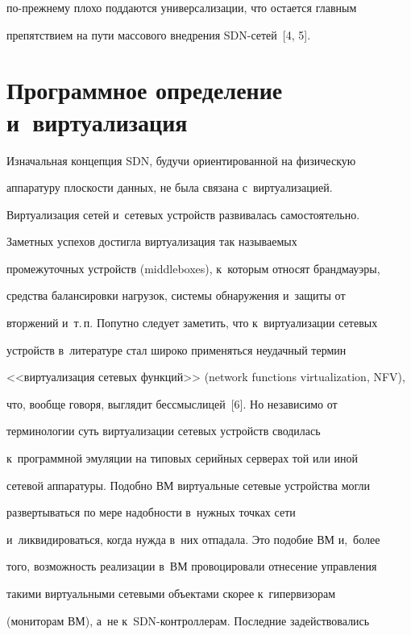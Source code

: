 по-преж\-не\-му плохо поддаются универсализации, что остается главным 


препятствием на пути массового внедрения SDN-сетей~[4, 5].





\section{Программное определение и~виртуализация}





    Изначальная концепция SDN, будучи ориентированной на физическую 


аппаратуру плос\-кости данных, не была связана с~виртуализацией. 


Виртуализация сетей и~сетевых устройств развивалась самостоятельно.


    


    Заметных успехов достигла виртуализация так называемых 


промежуточных устройств (middleboxes), к~которым относят брандмауэры, 


средства балансировки на\-гру\-зок, сис\-те\-мы обнаружения и~защиты от  


втор\-же\-ний и~т.\,п. Попутно следует заметить, что к~виртуализации сетевых 


устройств в~литературе стал широко применяться неудачный термин 


<<виртуализация сетевых функций>> (network functions virtualization, NFV), 


что, вообще говоря, выглядит бессмыслицей~[6]. Но независимо от 


терминологии суть виртуализации сетевых устройств сводилась 


к~программной эмуляции на типовых серийных серверах той или иной 


сетевой аппаратуры. Подобно ВМ виртуальные сетевые устройства могли 


развертываться по мере на\-доб\-ности в~нужных точках сети 


и~ликвидироваться, когда нуж\-да в~них отпадала. Это подобие ВМ и,~более 


того, воз\-мож\-ность реализации в~ВМ провоцировали отнесение управления 


такими виртуальными сетевыми объектами скорее к~гипервизорам 


(мониторам ВМ), а~не к~SDN-конт\-рол\-ле\-рам. Последние задействовались 


